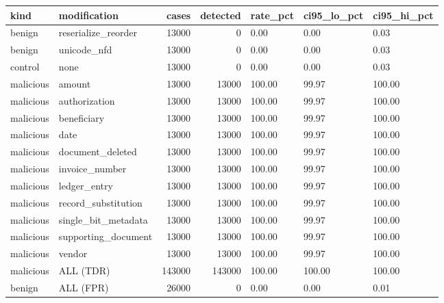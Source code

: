 \begin{tabular}{llrrlll}
\toprule
kind & modification & cases & detected & rate\_pct & ci95\_lo\_pct & ci95\_hi\_pct \\
\midrule
benign & reserialize\_reorder & 13000 & 0 & 0.00 & 0.00 & 0.03 \\
benign & unicode\_nfd & 13000 & 0 & 0.00 & 0.00 & 0.03 \\
control & none & 13000 & 0 & 0.00 & 0.00 & 0.03 \\
malicious & amount & 13000 & 13000 & 100.00 & 99.97 & 100.00 \\
malicious & authorization & 13000 & 13000 & 100.00 & 99.97 & 100.00 \\
malicious & beneficiary & 13000 & 13000 & 100.00 & 99.97 & 100.00 \\
malicious & date & 13000 & 13000 & 100.00 & 99.97 & 100.00 \\
malicious & document\_deleted & 13000 & 13000 & 100.00 & 99.97 & 100.00 \\
malicious & invoice\_number & 13000 & 13000 & 100.00 & 99.97 & 100.00 \\
malicious & ledger\_entry & 13000 & 13000 & 100.00 & 99.97 & 100.00 \\
malicious & record\_substitution & 13000 & 13000 & 100.00 & 99.97 & 100.00 \\
malicious & single\_bit\_metadata & 13000 & 13000 & 100.00 & 99.97 & 100.00 \\
malicious & supporting\_document & 13000 & 13000 & 100.00 & 99.97 & 100.00 \\
malicious & vendor & 13000 & 13000 & 100.00 & 99.97 & 100.00 \\
malicious & ALL (TDR) & 143000 & 143000 & 100.00 & 100.00 & 100.00 \\
benign & ALL (FPR) & 26000 & 0 & 0.00 & 0.00 & 0.01 \\
\bottomrule
\end{tabular}
